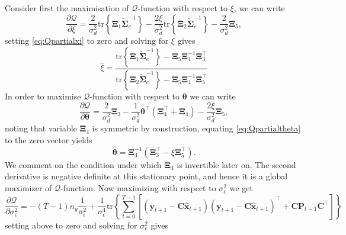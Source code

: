 \documentclass[]{article}
\begin{document}
Consider first the maximisation of $\mathcal{Q}$-function with respect to $\xi$, we can write
\begin{equation}\label{eq:Qpartialxi}
 \frac{\partial \mathcal Q}{\partial\xi}=\frac{2}{\sigma_d^2}\mathrm{tr}\left\lbrace \boldsymbol\Xi_1 \tilde{\boldsymbol\Sigma}_e^{-1}\right\rbrace -\frac{2\xi}{\sigma_d^2}\mathrm{tr}\left\lbrace \boldsymbol\Xi_2 \tilde{\boldsymbol\Sigma}_e^{-1}\right\rbrace-\frac{2}{\sigma_d^2}\boldsymbol\Xi_5,
\end{equation}
setting \eqref{eq:Qpartialxi} to zero and solving for $\xi$ gives
\begin{equation}
 \hat{\xi}=\frac{\mathrm{tr}\left\lbrace \boldsymbol\Xi_1 \tilde{\boldsymbol\Sigma}_e^{-1}\right\rbrace-\boldsymbol\Xi_5\boldsymbol\Xi_4^{-1}\boldsymbol\Xi_3^\top}{\mathrm{tr}\left\lbrace \boldsymbol\Xi_2 \tilde{\boldsymbol\Sigma}_e^{-1}\right\rbrace-\boldsymbol\Xi_5\boldsymbol\Xi_4^{-1}\boldsymbol\Xi_5^{\top}}
\end{equation}
In order to maximise $\mathcal{Q}$-function with respect to $\boldsymbol\theta$ we can write
\begin{equation}\label{eq:Qpartialtheta}
 \frac{\partial \mathcal Q}{\partial \boldsymbol\theta}=\frac{2}{\sigma_d^2}\boldsymbol\Xi_3-\frac{1}{\sigma_d^2}\boldsymbol\theta^\top(\boldsymbol\Xi_4^\top+\boldsymbol\Xi_4)-\frac{2\xi}{\sigma_d^2}\boldsymbol\Xi_5,
\end{equation}
noting that variable $\boldsymbol\Xi_4$ is symmetric by construction, equating \eqref{eq:Qpartialtheta} to the zero vector yields
\begin{equation}\label{eq:theta}
 \hat{\boldsymbol \theta}=\boldsymbol\Xi_4^{-1}\left(\boldsymbol\Xi_3^\top-\xi\boldsymbol\Xi_5^\top \right).
\end{equation}
We comment on the condition under which $\boldsymbol\Xi_4$ is invertible later on. The second derivative is negative definite at this stationary point, and hence it is a global maximizer of $\mathcal{Q}$-function. Now maximizing with respect to $\sigma_{\epsilon}^2$ we get
\begin{equation}
  \frac{\partial \mathcal Q}{\partial \sigma_{\epsilon}^2}=-(T-1)n_y\frac{1}{\sigma_{\epsilon}^2}+\frac{1}{\sigma_{\epsilon}^4}\mathrm{tr}\left\lbrace\sum_{t=0}^{T-1}\left[ (\mathbf y_{t+1}-\mathbf C\mathbf{\hat{x}}_{t+1}) (\mathbf y_{t+1}-\mathbf C\mathbf{\hat{x}}_{t+1})^\top+\mathbf C \mathbf P_{t+1}\mathbf C^\top\right] \right\rbrace
\end{equation}
setting above to zero and solving for $\sigma_{\epsilon}^2$ gives
\end{document}
